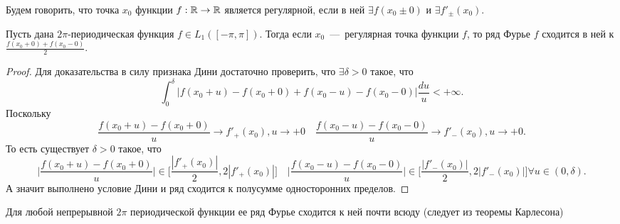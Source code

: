 \begin{definition}
    Будем говорить, что точка $x_0$ функции $f: \mathbb{R} \to \mathbb{R}$ является регулярной, если в ней $\exists f(x_0 \pm 0)$ и $\exists f'_\pm(x_0)$.
\end{definition}
\begin{corollary}
    Пусть дана $2\pi$-периодическая функция $f \in L_1([-\pi, \pi])$. Тогда если $x_0$~---~регулярная точка функции $f$, то ряд Фурье $f$ сходится в ней к $\frac{f(x_0 + 0) + f(x_0 - 0)}{2}$.
\end{corollary}
\begin{proof}
    Для доказательства в силу признака Дини достаточно проверить, что $\exists \delta > 0$ такое, что \[
                                                                                                          \int_0^\delta \bigg|f(x_0 + u) - f(x_0 + 0) + f(x_0 - u) - f(x_0 - 0)\bigg|\dfrac{du}{u} < +\infty.
    \]
    Поскольку \[
                  \dfrac{f(x_0 + u) - f(x_0 + 0)}{u} \rightarrow f'_+(x_0), u \rightarrow +0 \quad  \dfrac{f(x_0 - u) - f(x_0 - 0)}{u} \rightarrow f'_-(x_0), u \rightarrow +0.
    \]
    То есть существует $\delta > 0$ такое, что
    \[
        \biggr|\dfrac{f(x_0 + u) - f(x_0 + 0)}{u}\biggr| \in \biggr[\dfrac{|f'_+(x_0)|}{2}, 2|f'_+(x_0)|\biggr] \quad \biggr|\dfrac{f(x_0 - u) - f(x_0 - 0)}{u}\biggr| \in \biggr[\dfrac{|f'_-(x_0)|}{2}, 2|f'_-(x_0)|\biggr] \forall u \in (0, \delta).
    \]
    А значит выполнено условие Дини и ряд сходится к полусумме односторонних пределов.
\end{proof}

\begin{fact}
    Для любой непрерывной $2\pi$ периодической функции ее ряд Фурье сходится к ней почти всюду (следует из теоремы Карлесона)
\end{fact}



